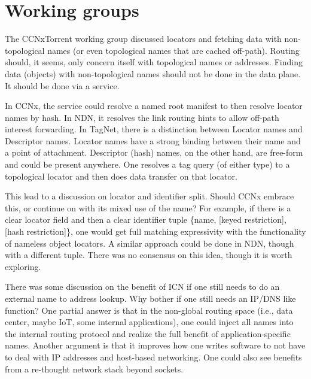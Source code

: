 \documentclass[a4paper,UKenglish]{dagrep}
\begin{document}


\section{Working groups}

\license

The CCNxTorrent working group discussed locators and fetching data with non-topological names (or even topological names that are cached off-path). Routing should, it seems, only concern itself with topological names or addresses.  Finding data (objects) with non-topological names should not be done in the data plane.  It should be done via a service.

In CCNx, the service could resolve a named root manifest to then resolve locator names by hash.
In NDN, it resolves the link routing hints to allow off-path interest forwarding. In TagNet,
there is a distinction between Locator names and Descriptor names. Locator names have a
strong binding between their name and a point of attachment. Descriptor (hash) names, on the
other hand, are free-form and could be present anywhere.  One resolves a tag query (of either
type) to a topological locator and then does data transfer on that locator.

This lead to a discussion on locator and identifier split.  Should CCNx embrace this, or continue on with its mixed use of the name? For example, if there is a clear locator field and then a clear identifier tuple \{name, [keyed restriction], [hash restriction]\}, one would get full matching expressivity with the functionality of nameless object locators.  A similar approach could be done in NDN, though with a different tuple.  There was no consensus on this idea, though it is worth exploring.

There was some discussion on the benefit of ICN if one still needs to do an external name to address lookup.  Why bother if one still needs an IP/DNS like function?  One partial answer is that in the non-global routing space (i.e., data center, maybe IoT, some internal applications), one could inject all names into the internal routing protocol and realize the full benefit of application-specific names.  Another argument is that it improves how one writes software to not have to deal with IP addresses and host-based networking.   One could also see benefits from a re-thought network stack beyond sockets.
\end{document}
